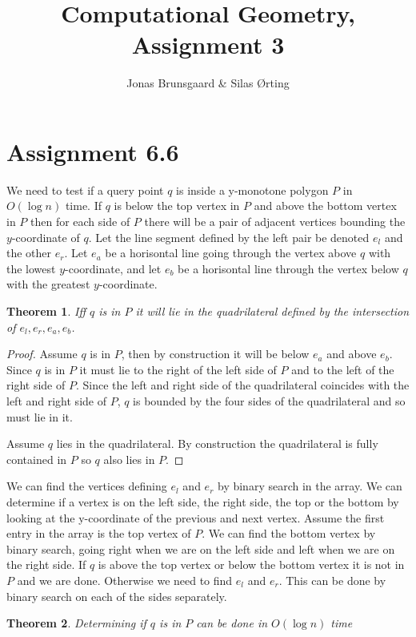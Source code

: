\documentclass[10pt,a4paper,final,oneside,openany,article]{memoir}
\title{Computational Geometry, Assignment 3}
\author{
    Jonas Brunsgaard \& Silas Ørting
}
\newtheorem{pinQ}{Theorem}
\newtheorem{pinQtime}[pinQ]{Theorem}
\begin{document}
\maketitle

\chapter*{Assignment 6.6}
We need to test if a query point $q$ is inside a y-monotone polygon $P$ in $O(\log n)$ time. If $q$ is below the top vertex in $P$ and above the bottom vertex in $P$ then for each side of $P$ there will be a pair of adjacent vertices bounding the $y$-coordinate of $q$. Let the line segment defined by the left pair be denoted $e_l$ and the other $e_r$. Let $e_a$ be a horisontal line going through the vertex above $q$ with the lowest $y$-coordinate, and let $e_b$ be a horisontal line through the vertex below $q$ with the greatest $y$-coordinate. 

\begin{pinQ}
  Iff $q$ is in $P$ it will lie in the quadrilateral defined by the intersection of $e_l, e_r, e_a, e_b$.  
\end{pinQ}

\begin{proof}
  Assume $q$ is in $P$, then by construction it will be below $e_a$ and above $e_b$. Since $q$ is in $P$ it must lie to the right of the left side of $P$ and to the left of the right side of $P$. Since the left and right side of the quadrilateral coincides with the left and right side of $P$, $q$ is bounded by the four sides of the quadrilateral and so must lie in it.
  
  Assume $q$ lies in the quadrilateral. By construction the quadrilateral is fully contained in $P$ so $q$ also lies in $P$.
\end{proof}

We can find the vertices defining $e_l$ and $e_r$ by binary search in the array.
We can determine if a vertex is on the left side, the right side, the top or the bottom by looking at the y-coordinate of the previous and next vertex. 
Assume the first entry in the array is the top vertex of $P$. We can find the bottom vertex by binary search, going right when we are on the left side and left when we are on the right side. If $q$ is above the top vertex or below the bottom vertex it is not in $P$ and we are done. Otherwise we need to find $e_l$ and $e_r$. This can be done by binary search on each of the sides separately. 

\begin{pinQtime}
  Determining if $q$ is in $P$ can be done in $O(\log n)$ time
\end{pinQtime}
\end{document}
